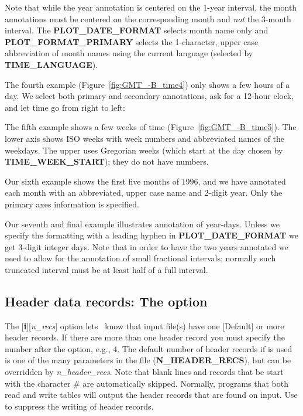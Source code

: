 

Note that while the year annotation is centered on the 1-year interval, the month annotations must be centered
on the corresponding month and \emph{not} the 3-month interval.  The \textbf{PLOT\_DATE\_FORMAT} selects month
name only and \textbf{PLOT\_FORMAT\_PRIMARY} selects the 1-character, upper case abbreviation of month names using
the current language (selected by \textbf{TIME\_LANGUAGE}).

The fourth example (Figure~\ref{fig:GMT_-B_time4}) only shows a few hours of a day.  We select both primary and
secondary annotations, ask for a 12-hour clock, and let time go from right to left:



The fifth example shows a few weeks of time (Figure~\ref{fig:GMT_-B_time5}).  The lower axis shows ISO weeks with
week numbers and abbreviated names of the weekdays.   The upper uses Gregorian weeks (which start at the day chosen
by \textbf{TIME\_WEEK\_START}); they do not have numbers.


Our sixth example shows the first five months of 1996, and we have annotated each month with an abbreviated, upper case
name and 2-digit year.  Only the primary axes information is specified.



Our seventh and final example illustrates annotation of year-days.  Unless we specify the formatting with a leading hyphen
in  \textbf{PLOT\_DATE\_FORMAT} we get 3-digit integer days.  Note that in order to have the two years
annotated we need to allow for the annotation of small fractional intervals; normally such truncated interval must
be at least half of a full interval.



\subsection{Header data records: The  option}
\label{sec:header}
The [\textbf{i}][\emph{n\_recs}] option lets \GMT\ know that input file(s) have
one [Default] or more header records.  If there are more than one header
record you must specify the number after the  option, e.g., 4.  The
default number of header records if  is used is one of the many parameters
in the  file (\textbf{N\_HEADER\_RECS}), but can be overridden
by \emph{n\_header\_recs}.
Note that blank lines and records that be start with the character \# are
automatically skipped.  Normally, programs that both read and write tables will
output the header records that are found on input.  Use  to suppress the
writing of header records.

